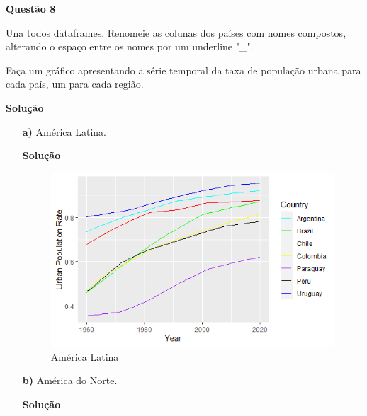 \documentclass[12pt, a4paper]{article}
\begin{document}




\textbf{Questão 8}

Una todos dataframes. Renomeie as colunas dos países com nomes compostos, alterando o espaço entre os nomes por um underline "\_". 

Faça um gráfico apresentando a série temporal da taxa de população urbana para cada país, um para cada região.


\textbf{Solução}





\begin{itemize}
	\item[\textbf{a)}] América Latina.
	
	
	\textbf{Solução}
	
	
	
	
	\begin{figure}[H]
		\caption{América Latina}
		\centering
		\includegraphics[scale=1.2]{images/latin_america.png}
	\end{figure}
	
	
	
	\item[\textbf{b)}] América do Norte.
	
	
	\textbf{Solução}
	
	
	

\end{itemize}
\end{document}
